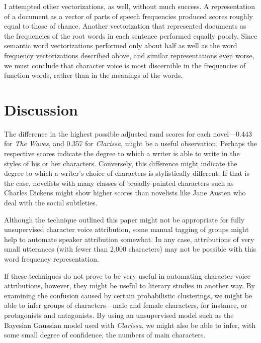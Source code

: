 \documentclass[12pt]{article}
\begin{document}
I attempted other vectorizations, as well, without much success. A
representation of a document as a vector of parts of speech frequencies
produced scores roughly equal to those of chance. Another vectorization
that represented documents as the frequencies of the root words in each
sentence performed equally poorly. Since semantic word vectorizations
performed only about half as well as the word frequency vectorizations
described above, and similar representations even worse, we must
conclude that character voice is most discernible in the frequencies of
function words, rather than in the meanings of the words.

\section{Discussion}\label{discussion}

The difference in the highest possible adjusted rand scores for each
novel---0.443 for \emph{The Waves}, and 0.357 for \emph{Clarissa}, might
be a useful observation. Perhaps the respective scores indicate the
degree to which a writer is able to write in the styles of his or her
characters. Conversely, this difference might indicate the degree to
which a writer's choice of characters is stylistically different. If
that is the case, novelists with many classes of broadly-painted
characters such as Charles Dickens might show higher scores than
novelists like Jane Austen who deal with the social subtleties.

Although the technique outlined this paper might not be appropriate for
fully unsupervised character voice attribution, some manual tagging of
groups might help to automate speaker attribution somewhat. In any case,
attributions of very small utterances (with fewer than 2,000 characters)
may not be possible with this word frequency representation.

If these techniques do not prove to be very useful in automating
character voice attributions, however, they might be useful to literary
studies in another way. By examining the confusion caused by certain
probabilistic clusterings, we might be able to infer groups of
characters---male and female characters, for instance, or protagonists
and antagonists. By using an unsupervised model such as the Bayesian
Gaussian model used with \emph{Clarissa}, we might also be able to
infer, with some small degree of confidence, the numbers of main
characters.
\end{document}
